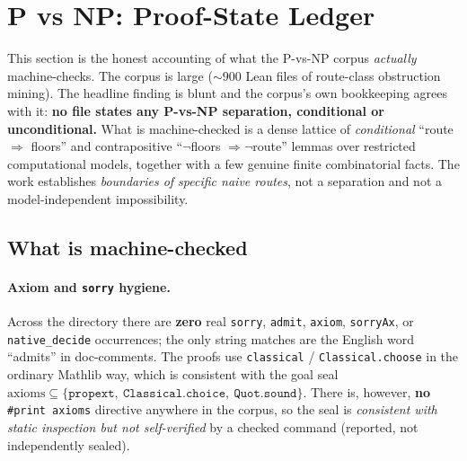 %

\section{P vs NP: Proof-State Ledger}
\label{sec:pnp-proofstate}

This section is the honest accounting of what the P-vs-NP corpus
\emph{actually} machine-checks. The corpus is large
(${\sim}900$ Lean files of route-class obstruction mining). The headline
finding is blunt and the corpus's own bookkeeping agrees with it: \textbf{no
file states any P-vs-NP separation, conditional or unconditional.} What is
machine-checked is a dense lattice of \emph{conditional} ``route $\Rightarrow$
floors'' and contrapositive ``$\lnot$floors $\Rightarrow \lnot$route''
lemmas over restricted computational models, together with a few genuine finite
combinatorial facts. The work establishes \emph{boundaries of specific naive
routes}, not a separation and not a model-independent impossibility.

\subsection{What is machine-checked}
\label{sec:pnp-checked}

\paragraph{Axiom and \texttt{sorry} hygiene.}
Across the directory there are \textbf{zero} real \texttt{sorry}, \texttt{admit},
\texttt{axiom}, \texttt{sorryAx}, or \texttt{native\_decide} occurrences; the
only string matches are the English word ``admits'' in doc-comments. The proofs
use \texttt{classical} / \texttt{Classical.choose} in the ordinary Mathlib way,
which is consistent with the goal seal
$\text{axioms} \subseteq \{\texttt{propext},\ \texttt{Classical.choice},\
\texttt{Quot.sound}\}$. There is, however, \textbf{no} \texttt{\#print axioms}
directive anywhere in the corpus, so the seal is \emph{consistent with static
inspection but not self-verified} by a checked command (reported, not
independently sealed).

